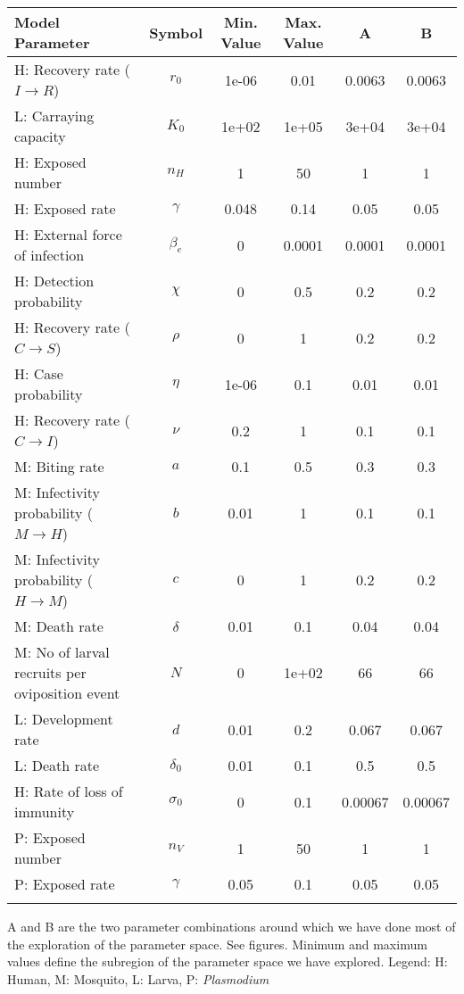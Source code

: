 \begin{table}
\noindent
\begin{tabular}{p{5cm}ccccc}
{\bf Model Parameter} & {\bf Symbol} & {\bf Min. Value} & {\bf Max. Value} & {\bf A} & {\bf B}\\
\hline\hline
  H: Recovery rate ($I \rightarrow R$) & $r_0$ & 1e-06 & 0.01 & 0.0063 & 0.0063\\
  L: Carraying capacity & $K_0$ & 1e+02 & 1e+05 & 3e+04 & 3e+04\\
  H: Exposed number & $n_H$ &    1 &   50 &    1 &    1\\
  H: Exposed rate & $\gamma$ & 0.048 & 0.14 & 0.05 & 0.05\\
  H: External force of infection & $\beta_e$ &    0 & 0.0001 & 0.0001 & 0.0001\\
  H: Detection probability & $\chi$ &    0 &  0.5 &  0.2 &  0.2\\
  H: Recovery rate ($C \rightarrow S$) & $\rho$ &    0 &    1 &  0.2 &  0.2\\
  H: Case probability & $\eta$ & 1e-06 &  0.1 & 0.01 & 0.01\\
  H: Recovery rate ($C \rightarrow I$) & $\nu$ &  0.2 &    1 &  0.1 &  0.1\\
  M: Biting rate & $a$ &  0.1 &  0.5 &  0.3 &  0.3\\
  M: Infectivity probability ($M \rightarrow H$) & $b$ & 0.01 &    1 &  0.1 &  0.1\\
  M: Infectivity probability ($H \rightarrow M$) & $c$ &    0 &    1 &  0.2 &  0.2\\
  M: Death rate & $\delta$ & 0.01 &  0.1 & 0.04 & 0.04\\
  M: No of larval recruits per oviposition event & $N$ &    0 & 1e+02 &   66 &   66\\
  L: Development rate & $d$ & 0.01 &  0.2 & 0.067 & 0.067\\
  L: Death rate & $\delta_0$ & 0.01 &  0.1 &  0.5 &  0.5\\
  H: Rate of loss of immunity & $\sigma_0$ &    0 &  0.1 & 0.00067 & 0.00067\\
  P: Exposed number & $n_V$ &    1 &   50 &    1 &    1\\
  P: Exposed rate & $\gamma$ & 0.05 &  0.1 & 0.05 & 0.05\\
\hline\hline
\smallskip
\end{tabular}
 A and B are the two parameter combinations around which we have done most of the exploration of the parameter space. See figures. Minimum and maximum values define the subregion of the parameter space we have explored. Legend: {\small H: Human, M: Mosquito, L: Larva, P: {\em Plasmodium}} 
\end{table}

